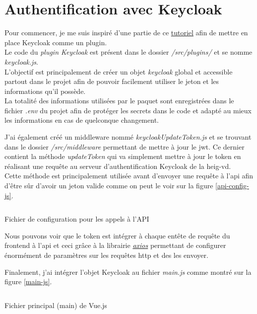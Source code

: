 \documentclass[
    iai, %
    il, %
]{heig-tb}
\begin{document}
\section{Authentification avec Keycloak}
Pour commencer, je me suis inspiré d'une partie de ce \href{https://davidtruxall.com/secure-a-vue-js-app-with-keycloak/}{tutoriel} afin de mettre en place Keycloak comme un plugin. \\
Le code du \emph{plugin Keycloak} est présent dans le dossier \emph{/src/plugins/} et se nomme \emph{keycloak.js}. \\
L'objectif est principalement de créer un objet \emph{keycloak} global et accessible partout dans le projet afin de pouvoir facilement utiliser le jeton et les informations qu'il possède. \\
La totalité des informations utilisées par le paquet sont enregistrées dans le fichier \emph{.env} du projet afin de protéger les secrets dans le code et adapté au mieux les informations en cas de quelconque changement.

J'ai également créé un middleware nommé \emph{keycloakUpdateToken.js} et se trouvant dans le dossier \emph{/src/middleware} permettant de mettre à jour le \Gls{jwt}. Ce dernier contient la méthode \emph{updateToken} qui va simplement mettre à jour le token en réalisant une requête au serveur d'authentification Keycloak de la \Gls{heig-vd}. \\
Cette méthode est principalement utilisée avant d'envoyer une requête à l'\Gls{api} afin d'être sûr d'avoir un jeton valide comme on peut le voir sur la figure \ref{api-config-js}. \\

\begin{listing}[H]
    \inputminted{js}{assets/code/apiConfig.js}
    \caption{Fichier de configuration pour les appels à l'API \label{api-config-js}}
\end{listing}

Nous pouvons voir que le token est intégrer à chaque entête de requête du \Gls{frontend} à l'\Gls{api} et ceci grâce à la librairie \href{https://axios-http.com/fr/docs/intro}{\emph{axios}} permettant de configurer énormément de paramètres sur les requêtes \Gls{http} et des les envoyer.

Finalement, j'ai intégrer l'objet Keycloak au fichier \emph{main.js} comme montré sur la figure \ref{main-js}.

\begin{listing}[H]
    \inputminted{js}{assets/code/main.js}
    \caption{Fichier principal (main) de Vue.js \label{main-js}}
\end{listing}
\end{document}
